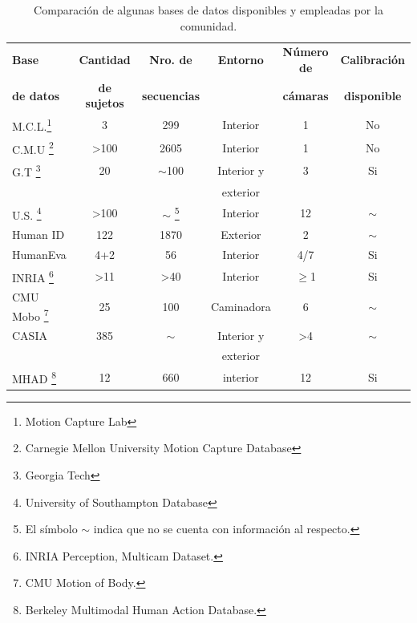 \begin{table}[ht!]	
	\hspace{-1cm}	
	\caption{Comparación de algunas bases de datos disponibles y empleadas por la comunidad.}
	\label{bases_relevadas}
	\begin{minipage}{\textwidth} %
	\resizebox{15cm}{!} {
	\begin{tabular}{||l|ccccc||} 
\hline
\rowcolor[HTML]{CBCEFB} 

\textbf{Base}     & \textbf{Cantidad }  & \textbf{Nro. de }   & \textbf{Entorno} & \textbf{Número de} & \textbf{Calibración}\\
\rowcolor[HTML]{CBCEFB} 
\textbf{de datos} & \textbf{de sujetos} & \textbf{secuencias} &         & \textbf{cámaras }  &  \textbf{disponible} \\


\hline \hline
M.C.L.\footnote{Motion Capture Lab}  & 3 		& 		299	   & Interior&     1    &    No      \\ \hline
C.M.U  \footnote{Carnegie Mellon University Motion Capture Database}	
 & >100     &       2605   & Interior&      1   &    No       \\ \hline
G.T \footnote{Georgia Tech} &       20    & $\sim$100           & Interior y &   3      &  Si       \\ 
	 &		 &					 & exterior        &         &    \\ \hline
U.S. \footnote{University of Southampton Database} &       >100    &     $\sim$ \footnote{El símbolo $\sim$ indica que no se cuenta con información al respecto.}  & Interior &   12      &  $\sim$      \\ \hline
Human ID  &     122    & 1870           & Exterior &   2      &$\sim$       \\ \hline
HumanEva &     4+2    & 56           & Interior &   4/7      &  Si       \\ \hline
INRIA \footnote{INRIA Perception, Multicam Dataset. } &       >11    & >40           & Interior &   $\geq$1      &  Si       \\ \hline
CMU Mobo \footnote{CMU Motion of Body.} &     25    & 100           & Caminadora &   6      &  $\sim$       \\ \hline
CASIA &     385    & $\sim$           & Interior y  &   >4      &  $\sim$       \\ 
&         &            & exterior  &         &      \\ \hline
MHAD \footnote{Berkeley Multimodal Human Action Database.} & 12         & 660            & interior  & 12        & Si      \\ 
\hline \hline



\end{tabular}}
\end{minipage}
\end{table}
